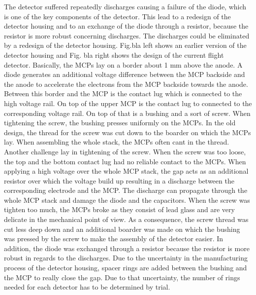 	The detector suffered repeatedly discharges causing a failure of the diode, which is one of the key components of the detector. This lead to a redesign of the detector housing and to an exchange of the diode through a resistor, because the resistor is more robust concerning discharges. %
	The discharges could be eliminated by a redesign of the detector housing. %
	Fig.bla left shows an earlier version of the detector housing and Fig. bla right shows the design of the current flight detector.
	Basically, the MCPs lay on a border about 1 mm above the anode. %
	A diode generates an additional voltage difference between the MCP backside and the anode to accelerate the electrons from the MCP backside towards the anode. Between this border and the MCP is the contact lug which is connected to the high voltage rail. On top of the upper MCP is the contact lug to connected to the corresponding voltage rail. On top of that is a bushing and a sort of screw. When tightening the screw, the bushing presses uniformly on the MCPs. In the old design, the thread for the screw was cut down to the boarder on which the MCPs lay. When assembling the whole stack, the MCPs often cant in the thread. Another challenge lay in tightening of the screw. When the screw was too loose, the top and the bottom contact lug had no reliable contact to the MCPs. When applying a high voltage over the whole MCP stack, the gap acts as an additional resistor over which the voltage build up resulting in a discharge between the corresponding electrode and the MCP. The discharge can propagate through the whole MCP stack and damage the diode and the capacitors. When the screw was tighten too much, the MCPs broke as they consist of lead glass and are very delicate in the mechanical point of view. As a consequence, the screw thread was cut less deep down and an additional boarder was made on which the bushing was pressed by the screw to make the assembly of the detector easier. In addition, the diode was exchanged through a resistor because the resistor is more robust in regards to the discharges. Due to the uncertainty in the manufacturing process of the detector housing, spacer rings are added between the bushing and the MCP to really close the gap. Due to that uncertainty, the number of rings needed for each detector has to be determined by trial.
	
